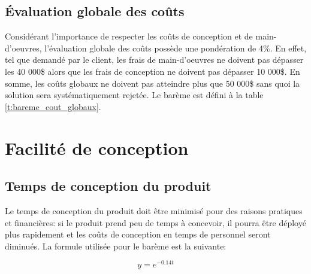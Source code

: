\subsection{Évaluation globale des coûts}

\begin{table}
\caption{Évaluation du barème des coûts globaux}
\label{t:bareme_cout_globaux}
\end{table}

Considérant l'importance de respecter les coûts de conception et de main-d'oeuvres, l'évaluation globale des coûts possède une pondération de 4\%. En effet, tel que demandé par le client, les frais de main-d'oeuvres ne doivent pas dépasser les 40 000\$ alors que les frais de conception ne doivent pas dépasser 10 000\$. En somme, les coûts globaux ne doivent pas atteindre plus que 50 000\$ sans quoi la solution sera systématiquement rejetée. Le barème est défini à la table \ref{t:bareme_cout_globaux}.

\section{Facilité de conception}

\subsection{Temps de conception du produit}

Le temps de conception du produit doit être minimisé pour des raisons pratiques et financières: si le produit prend peu de temps à concevoir, il pourra être déployé plus rapidement et les coûts de conception en temps de personnel seront diminués. La formule utilisée pour le barème est la suivante:

\begin{equation}
    y=e^{-0.14t}
\label{eq:bareme_temps_conception}    
\end{equation}

